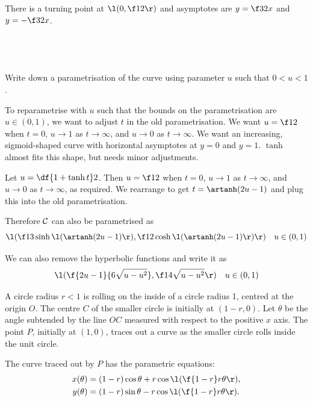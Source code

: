 \documentclass[a4paper]{article}
\begin{document}
There is a turning point at $\l(0, \f12\r)$ and asymptotes are $y = \f32 x$ and $y = -\f32 x$.

\newpage
\subsection{~} %

\begin{questionbody}
Write down a parametrisation of the curve using parameter $u$ such that $0 < u < 1$.
\end{questionbody}

To reparametrise with $u$ such that the bounds on the parametrisation are $u \in (0, 1)$, we want to adjust $t$ in the old parametrisation. We want $u = \f12$ when $t = 0$, $u \to 1$ as $t \to \infty$, and $u \to 0$ as $t \to \infty$. We want an increasing, sigmoid-shaped curve with horizontal asymptotes at $y=0$ and $y=1$. $\tanh$ almost fits this shape, but needs minor adjustments.

Let $u = \df{1 + \tanh t}2$. Then $u = \f12$ when $t = 0$, $u \to 1$ as $t \to \infty$, and $u \to 0$ as $t \to \infty$, as required. We rearrange to get $t = \artanh(2u - 1)$ and plug this into the old parametrisation.

Therefore $\cal C$ can also be parametrised as \[
\l( \f13 \sinh\l(\artanh(2u - 1)\r), \f12 \cosh\l(\artanh(2u - 1)\r) \r) \quad u \in (0, 1)
\]

We can also remove the hyperbolic functions and write it as \[
\l( \f{2u-1}{6\sqrt{u - u^2}}, \f1{4\sqrt{u - u^2}} \r) \quad u \in (0, 1)
\]


\begin{questionbody}
A circle radius $r < 1$ is rolling on the inside of a circle radius 1, centred at the origin $O$. The centre $C$ of the smaller circle is initially at $(1 - r, 0)$. Let $\theta$ be the angle subtended by the line $OC$ measured with respect to the positive $x$ axis. The point $P$, initially at $(1, 0)$, traces out a curve as the smaller circle rolls inside the unit circle.

The curve traced out by $P$ has the parametric equations: \begin{align*}
x(\theta) &= (1 - r) \cos \theta + r \cos \l( \f{1-r}r \theta \r) , \\
y(\theta) &= (1 - r) \sin \theta - r \cos \l( \f{1-r}r \theta \r) .
\end{align*}
\end{questionbody}
\end{document}
